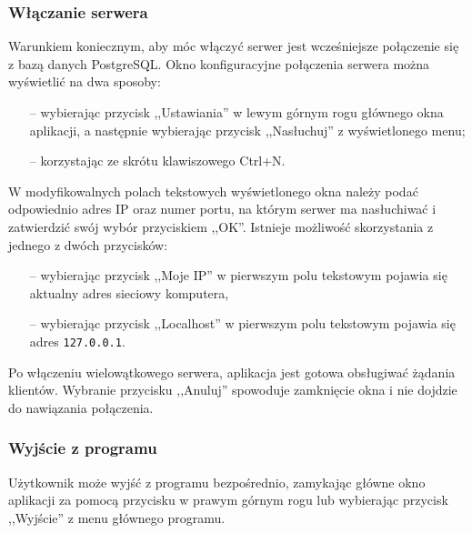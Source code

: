 \documentclass[a4paper,12pt]{article}
\begin{document}
\subsubsection[Włączanie serwera]{Włączanie serwera}
Warunkiem koniecznym, aby móc włączyć serwer jest wcześniejsze połączenie się z bazą danych PostgreSQL.
Okno konfiguracyjne połączenia serwera można wyświetlić na dwa sposoby:
\begin{itemize}
\item[--] wybierając przycisk ,,Ustawiania'' w lewym górnym rogu głównego okna aplikacji,
a następnie wybierając przycisk ,,Nasłuchuj'' z wyświetlonego menu;
\item[--] korzystając ze skrótu klawiszowego Ctrl+N.
\end{itemize}
W modyfikowalnych polach tekstowych wyświetlonego okna należy podać odpowiednio adres IP oraz numer portu,
na którym serwer ma nasłuchiwać i zatwierdzić swój wybór przyciskiem ,,OK''.
Istnieje możliwość skorzystania z jednego z dwóch przycisków:
\begin{itemize}
\item[--] wybierając przycisk ,,Moje IP'' w pierwszym polu tekstowym pojawia się aktualny adres sieciowy komputera,
\item[--] wybierając przycisk ,,Localhost'' w pierwszym polu tekstowym pojawia się adres \texttt{127.0.0.1}.
\end{itemize}
Po włączeniu wielowątkowego serwera, aplikacja jest gotowa obsługiwać żądania klientów.
Wybranie przycisku ,,Anuluj'' spowoduje zamknięcie okna i nie dojdzie do nawiązania
połączenia.

\subsubsection[Wyjście z programu]{Wyjście z programu}
Użytkownik może wyjść z programu bezpośrednio, zamykając główne okno aplikacji za
pomocą przycisku w prawym górnym rogu lub wybierając przycisk ,,Wyjście'' z menu
głównego programu.
\end{document}
